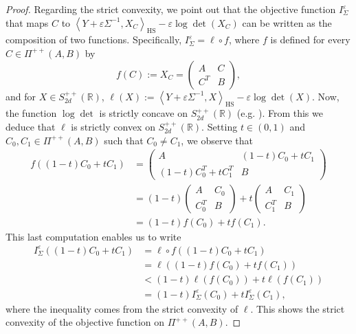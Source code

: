 \documentclass[]{article}
\DeclareMathOperator{\HS}{HS}
\numberwithin{equation}{section}
\theoremstyle{plain}
\begin{document}
\begin{proof}
Regarding the strict convexity, we point out that the objective function $I_{\Sigma}^{\varepsilon}$ that maps $C$ to $\left\langle Y + \varepsilon \Sigma^{-1}, X_C
\right\rangle_{\HS} - \varepsilon \log \det (X_C)$ can be written as the composition of two functions. Specifically, $I_{\Sigma}^{\varepsilon} = \ell \circ f$, where $f$ is defined for every $C \in \Pi^{++}(A,B)$ by 
\begin{equation*}
	f(C) := X_C = \begin{pmatrix}
		A & C \\
		C^T & B
	\end{pmatrix}, 
\end{equation*}
and for $X \in S_{2d}^{++}(\mathbb{R})$, $\ell(X) := \left\langle Y + \varepsilon \Sigma^{-1}, X
\right\rangle_{\HS} - \varepsilon \log \det (X)$. Now, the function $\log \det$ is strictly concave on $S_{2d}^{++}(\mathbb{R})$ (e.g. \citep[p.~42,~Cor.~1.4.2]{bakonyi2011matrix}). From this we deduce that $\ell$ is strictly convex on $S_{2d}^{++}(\mathbb{R})$. Setting $t \in (0,1)$ and $C_0, C_1 \in \Pi^{++}(A,B)$ such that $C_0 \neq C_1$, we observe that 
\begin{align*}
	f((1-t)C_0 + t C_1) & = \begin{pmatrix}
		A & (1-t)C_0 + t C_1 \\
		(1-t)C_0^T + t C_1^T & B
	\end{pmatrix} \\
& =  (1-t) \begin{pmatrix}
	A & C_0 \\
	C_0^T & B
\end{pmatrix} + t \begin{pmatrix}
A & C_1 \\
C_1^T & B
\end{pmatrix} \\
& = (1-t)f(C_0) + tf(C_1).
\end{align*}
This last computation enables us to write 
\begin{align*}
	I_{\Sigma}^{\varepsilon}((1-t)C_0 + t C_1) & = \ell \circ f((1-t)C_0 + t C_1) \\
	& = \ell((1-t)f(C_0) + tf(C_1)) \\
	& < (1-t) \ell(f(C_0)) + t \ell(f(C_1)) \\
	& =  (1-t) 	I_{\Sigma}^{\varepsilon}(C_0) + t 	I_{\Sigma}^{\varepsilon}(C_1),
\end{align*}
where the inequality comes from the strict convexity of $\ell$. This shows the strict convexity of the objective function on $\Pi^{++}(A,B)$.
\end{proof}
\end{document}
